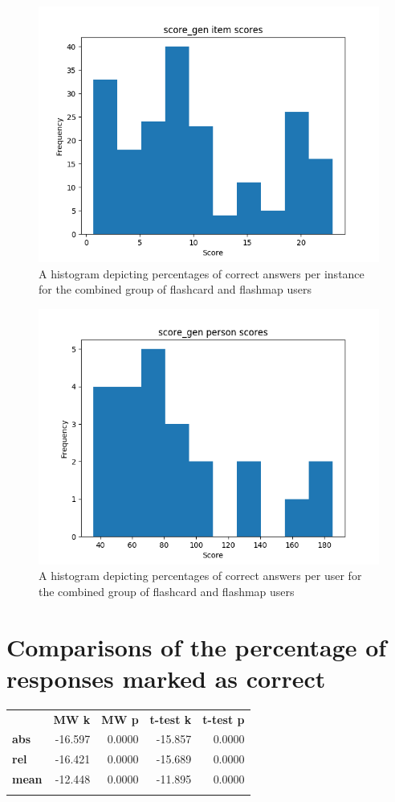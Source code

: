 \begin{figure}
    \centering
    \includegraphics[width=.7\textwidth]{img/score_gen_diff.png}
    \caption{A histogram depicting percentages of correct answers per instance for the combined group of flashcard and flashmap users}
    \label{fig:score_gen_diff}
\end{figure}
\begin{figure}
    \centering
    \includegraphics[width=.7\textwidth]{img/score_gen_abil.png}
    \caption{A histogram depicting percentages of correct answers per user for the combined group of flashcard and flashmap users}
    \label{fig:score_gen_abil}
\end{figure}

\section{Comparisons of the percentage of responses marked as correct}

\begin{longtable}[c]{@{}lrrrr@{}}
\toprule\addlinespace
& \textbf{MW k} & \textbf{MW p} &
\textbf{t-test k} & \textbf{t-test p}
\\\addlinespace
\midrule
\textbf{abs} & -16.597 & 0.0000 & -15.857 & 0.0000
\\\addlinespace
\textbf{rel} & -16.421 & 0.0000 & -15.689 & 0.0000
\\\addlinespace
\textbf{mean} & -12.448 & 0.0000 & -11.895 & 0.0000
\\\addlinespace
\bottomrule
    \label{tab:score_comp}
\end{longtable}

